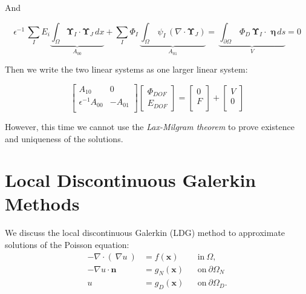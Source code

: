 \documentclass[10pt]{report}
\numberwithin{equation}{section}
\begin{document}
\noindent
And

$$  \epsilon^{-1} \, \sum_{I} E_{i }\underbrace{\int_{\Omega} \boldsymbol \Upsilon_{I} \cdot \boldsymbol \Upsilon_{J} \, dx}_{A_{00}}
+\sum_{I} \Phi_{I} \,  \underbrace{\int_{\Omega} \, \psi _{I}
\, \left( \nabla \cdot \boldsymbol \Upsilon_{J} \right)}_{A_{01}}
=  \, \underbrace{\int_{\partial \Omega} \, \Phi_{D} \, \boldsymbol \Upsilon_{I}
\cdot \, \boldsymbol \, \boldsymbol \eta \, ds}_{V} = 0
$$

\vspace{2mm}

\noindent
Then we write the two linear systems as one larger linear system:


\vspace{2mm}


\begin{equation}
\left[ \begin{matrix}
 A_{10} & 0 \\
\epsilon^{-1} A_{00} & -A_{01} \\
\end{matrix} \right]
\left[ \begin{matrix}
\Phi_{DOF} \\
E_{DOF}
\end{matrix} \right] =
\left[ \begin{matrix}
0 \\
F  \\      
\end{matrix}\right]  + 
\left[ \begin{matrix}
V\\
0 \\
\end{matrix} \right]
\end{equation}

\vspace{2mm}

\noindent
However, this time we cannot use the \textit{Lax-Milgram theorem} to prove existence and uniqueness of the solutions.


\chapter{Local Discontinuous Galerkin Methods}
We discuss the local discontinuous Galerkin (LDG) method to approximate solutions of the Poisson equation:
\begin{equation}
\begin{aligned}
- \nabla \cdot  \left(\ \nabla u \ \right)&= f(\textbf{x}) && \mbox{in} \ \Omega, \\
-\nabla u \cdot \textbf{n}  &= g_{N}(\textbf{x}) && \mbox{on} \ \partial \Omega_{N} \\
u &= g_{D}(\textbf{x}) && \mbox{on}  \ \partial \Omega_{D}.
\end{aligned}
\end{equation}
\end{document}
